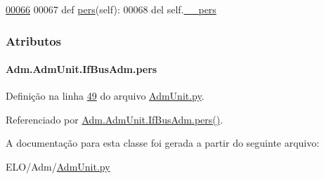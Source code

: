 \begin{DoxyCode}
\hypertarget{classAdm_1_1AdmUnit_1_1IfBusAdm_l00066}{}\hyperlink{classAdm_1_1AdmUnit_1_1IfBusAdm_a31857b146085382c8d778ae90cd46c6f}{00066} 
00067     \textcolor{keyword}{def }\hyperlink{classAdm_1_1AdmUnit_1_1IfBusAdm_a95ea8f39fbbcddf44822e1614c712bfe}{pers}(self):
00068         del self.\hyperlink{classAdm_1_1AdmUnit_1_1IfBusAdm_a52e9179e1047122bc667c1afa377c82c}{\_\_pers}

\end{DoxyCode}


\subsubsection{Atributos}
\hypertarget{classAdm_1_1AdmUnit_1_1IfBusAdm_a95ea8f39fbbcddf44822e1614c712bfe}{
\paragraph[{pers}]{\setlength{\rightskip}{0pt plus 5cm}Adm.\-Adm\-Unit.\-If\-Bus\-Adm.\-pers}}\label{classAdm_1_1AdmUnit_1_1IfBusAdm_a95ea8f39fbbcddf44822e1614c712bfe}


Definição na linha \hyperlink{AdmUnit_8py_source_l00049}{49} do arquivo \hyperlink{AdmUnit_8py_source}{Adm\-Unit.\-py}.



Referenciado por \hyperlink{classAdm_1_1AdmUnit_1_1IfBusAdm_a31857b146085382c8d778ae90cd46c6f}{Adm.\-Adm\-Unit.\-If\-Bus\-Adm.\-pers()}.



A documentação para esta classe foi gerada a partir do seguinte arquivo\-:\begin{DoxyCompactItemize}
\item 
E\-L\-O/\-Adm/\hyperlink{AdmUnit_8py}{Adm\-Unit.\-py}\end{DoxyCompactItemize}
